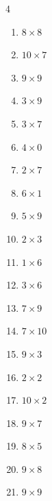 \begin{multicols}{4}
\begin{enumerate}
  \item $8\times 8$
        \phantom{$=64$}

  \item $10\times 7$
        \phantom{$=70$}

\columnbreak %

  \item $9\times 9$
        \phantom{$=81$}

  \item $3\times 9$
        \phantom{$=27$}

  \item $3\times 7$
        \phantom{$=21$}

  \item $4\times 0$
        \phantom{$=0$}

  \item $2\times 7$
        \phantom{$=14$}

  \item $6\times 1$
        \phantom{$=6$}

  \item $5\times 9$
        \phantom{$=45$}

  \item $2\times 3$
        \phantom{$=6$}

  \item $1\times 6$
        \phantom{$=6$}

  \item $3\times 6$
        \phantom{$=18$}

  \item $7\times 9$
        \phantom{$=63$}

  \item $7\times 10$
        \phantom{$=70$}

  \item $9\times 3$
        \phantom{$=27$}

  \item $2\times 2$
        \phantom{$=4$}

  \item $10\times 2$
        \phantom{$=20$}

  \item $9\times 7$
        \phantom{$=63$}

  \item $8\times 5$
        \phantom{$=40$}

  \item $9\times 8$
        \phantom{$=72$}

  \item $9\times 9$
        \phantom{$=81$}


\end{enumerate}
\end{multicols}
